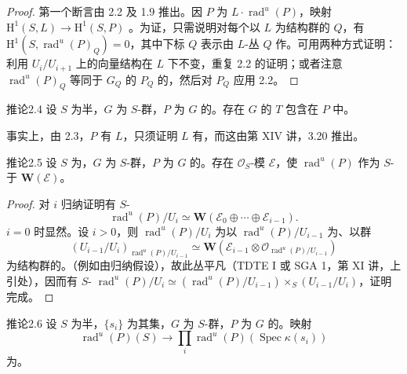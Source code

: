 \begin{proof}
第一个断言由 2.2 及 1.9 推出。因 $P$ 为 $L\cdot\operatorname{rad}^{u}(P)$，映射 $\mathrm H^1(S,L)\to\mathrm H^1(S,P)$ 。为证，只需说明对每个以 $L$ 为结构群的 $Q$，有 $\mathrm H^1(S,\operatorname{rad}^{u}(P)_Q)=0$，其中下标 $Q$ 表示由 $L$-丛 $Q$ 作。可用两种方式证明：利用 $U_i/U_{i+1}$ 上的向量结构在 $L$ 下不变，重复 2.2 的证明；或者注意 $\operatorname{rad}^{u}(P)_Q$ 等同于 $G_Q$ 的 $P_Q$ 的，然后对 $P_Q$ 应用 2.2。
\end{proof}
\begin{SGAresult}{推论}{2.4}
设 $S$ 为半，$G$ 为 $S$-群，$P$ 为 $G$ 的。存在 $G$ 的 $T$ 包含在 $P$ 中。
\end{SGAresult}
事实上，由 2.3，$P$ 有 $L$，只须证明 $L$ 有，而这由第 XIV 讲，3.20 推出。
\begin{SGAresult}{推论}{2.5}
设 $S$ 为，$G$ 为 $S$-群，$P$ 为 $G$ 的。存在 $\mathcal O_S$-模 $\mathcal E$，使 $\operatorname{rad}^{u}(P)$ 作为 $S$-于 $\mathbf W(\mathcal E)$。
\end{SGAresult}
\begin{proof}
对 $i$ 归纳证明有 $S$-
\[\operatorname{rad}^{u}(P)/U_i\simeq\mathbf W(\mathcal E_0\oplus\cdots\oplus\mathcal E_{i-1}).\]
$i=0$ 时显然。设 $i>0$，则 $\operatorname{rad}^{u}(P)/U_i$ 为以 $\operatorname{rad}^{u}(P)/U_{i-1}$ 为、以群
\[(U_{i-1}/U_i)_{\operatorname{rad}^{u}(P)/U_{i-1}}\simeq\mathbf W(\mathcal E_{i-1}\otimes\mathcal O_{\operatorname{rad}^{u}(P)/U_{i-1}})\]
为结构群的。（例如由归纳假设），故此丛平凡（TDTE I 或 SGA 1，第 XI 讲，上引处），因而有 $S$- $\operatorname{rad}^{u}(P)/U_i\simeq(\operatorname{rad}^{u}(P)/U_{i-1})\times_S(U_{i-1}/U_i)$，证明完成。
\end{proof}
\begin{SGAresult}{推论}{2.6}
设 $S$ 为半，$\{s_i\}$ 为其集，$G$ 为 $S$-群，$P$ 为 $G$ 的。映射
\[\operatorname{rad}^{u}(P)(S)\longrightarrow\prod_i\operatorname{rad}^{u}(P)(\operatorname{Spec}\kappa(s_i))\]
为。
\end{SGAresult}

